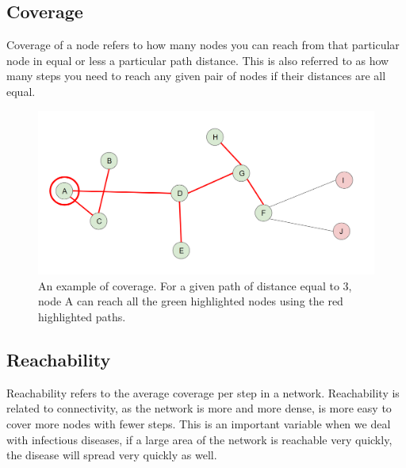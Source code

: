 \subsection{Coverage}

Coverage of a node refers to how many nodes you can reach from that particular node in equal or less a particular path distance. This is also referred to as how many steps you need to reach any given pair of nodes if their distances are all equal.

    \begin{figure}[h!]
        \centering
            \includegraphics[width=0.7\linewidth]{figures/Networks/Concepts/coverage.png} 
        \caption{An example of coverage. For a given path of distance equal to 3, node A can reach all the green highlighted nodes using the red highlighted paths.}
        \label{figure:networkCoverage}
    \end{figure}

\subsection{Reachability}

Reachability refers to the average coverage per step in a network. Reachability is related to connectivity, as the network is more and more dense, is more easy to cover more nodes with fewer steps. This is an important variable when we deal with infectious diseases, if a large area of the network is reachable very quickly, the disease will spread very quickly as well.

